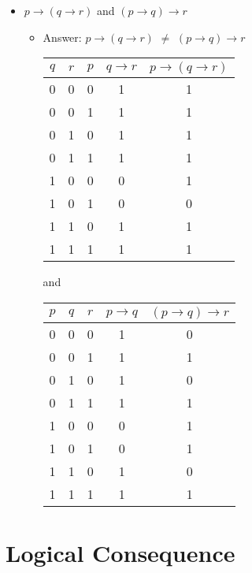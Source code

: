 \documentclass[11pt]{article}
\begin{document}
\begin{itemize}
\item $ p \to (q \to r)$ and $ (p \to q) \to r$

 \begin{itemize}
\item Answer: $ p \to (q \to r)$ $ \ne  $ $ (p \to q) \to r$

\vskip 0.1in

\begin{tabular}{|c|c|c|c|c|}
\hline
$q$ & $r$ & $p$ & $q \to r$ & $p \to (q \to r)$ \\
\hline
0 & 0 & 0 & 1 & 1 \\
0 & 0 & 1 & 1 & 1 \\
0 & 1 & 0 & 1 & 1 \\
0 & 1 & 1 & 1 & 1 \\
1 & 0 & 0 & 0 & 1 \\
1 & 0 & 1 & 0 & 0 \\
1 & 1 & 0 & 1 & 1 \\
1 & 1 & 1 & 1 & 1 \\
\hline
\end{tabular}

\vskip 0.1in
and
\vskip 0.1in

\begin{tabular}{|c|c|c|c|c|}
\hline
$p$ & $q$ & $r$ & $p \to q$ & $(p \to q) \to r$ \\
\hline
0 & 0 & 0 & 1 & 0 \\
0 & 0 & 1 & 1 & 1 \\
0 & 1 & 0 & 1 & 0 \\
0 & 1 & 1 & 1 & 1 \\
1 & 0 & 0 & 0 & 1 \\
1 & 0 & 1 & 0 & 1 \\
1 & 1 & 0 & 1 & 0 \\
1 & 1 & 1 & 1 & 1 \\
\hline
\end{tabular}





\end{itemize}

 \end{itemize} 







\section{Logical Consequence}
\end{document}
